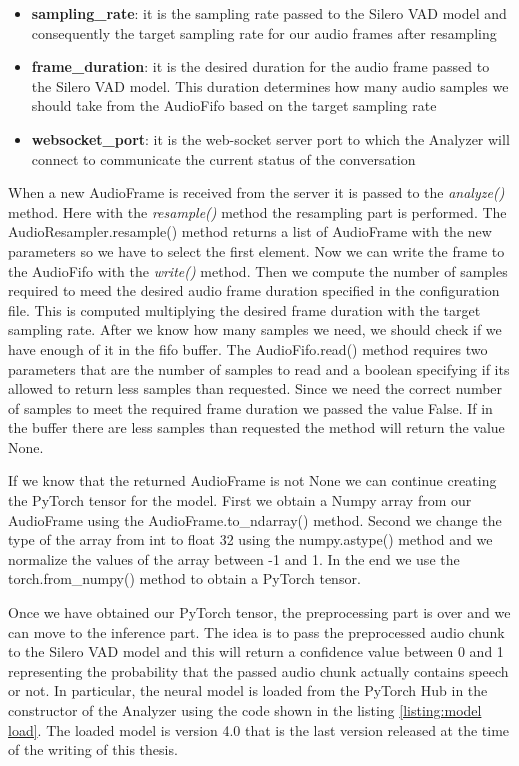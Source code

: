 \documentclass[../main.tex]{subfiles}
\begin{document}
\begin{itemize}
    \item \textbf{sampling\_rate}: it is the sampling rate passed to the Silero VAD model and consequently the target sampling rate for our audio frames after resampling 
    \item \textbf{frame\_duration}: it is the desired duration for the audio frame passed to the Silero VAD model. This duration determines how many audio samples we should take from the AudioFifo based on the target sampling rate
    \item \textbf{websocket\_port}: it is the web-socket server port to which the Analyzer will connect to communicate the current status of the conversation
\end{itemize}

When a new AudioFrame is received from the server it is passed to the \textit{analyze()} method. Here with the \textit{resample()} method the resampling part is performed. The AudioResampler.resample() method returns a list of AudioFrame with the new parameters so we have to select the first element. Now we can write the frame to the AudioFifo with the \textit{write()} method. Then we compute the number of samples required to meed the desired audio frame duration specified in the configuration file. This is computed multiplying the desired frame duration with the target sampling rate. After we know how many samples we need, we should check if we have enough of it in the fifo buffer. The AudioFifo.read() method requires two parameters that are the number of samples to read and a boolean specifying if its allowed to return less samples than requested. Since we need the correct number of samples to meet the required frame duration we passed the value False. If in the buffer there are less samples than requested the method will return the value None. 

If we know that the returned AudioFrame is not None we can continue creating the PyTorch tensor for the model. First we obtain a Numpy array from our AudioFrame using the AudioFrame.to\_ndarray() method. Second we change the type of the array from int to float 32 using the numpy.astype() method and we normalize the values of the array between -1 and 1. In the end we use the torch.from\_numpy() method to obtain a PyTorch tensor.

Once we have obtained our PyTorch tensor, the preprocessing part is over and we can move to the inference part. The idea is to pass the preprocessed audio chunk to the Silero VAD model and this will return a confidence value between 0 and 1 representing the probability that the passed audio chunk actually contains speech or not. In particular, the neural model is loaded from the PyTorch Hub in the constructor of the Analyzer using the code shown in the listing \ref{listing:model load}. The loaded model is version 4.0 that is the last version released at the time of the writing of this thesis. 
\end{document}
